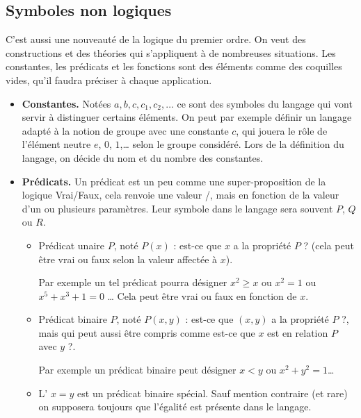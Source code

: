 \documentclass[11pt,class=report,crop=false]{standalone}
\begin{document}
\subsection{Symboles non logiques}

C'est aussi une nouveauté de la logique du premier ordre. On veut des constructions et des théories qui s'appliquent à de nombreuses situations. 
Les constantes, les prédicats et les fonctions sont des éléments comme des coquilles vides, qu'il faudra préciser à chaque application.
 
\begin{itemize}
	\item \textbf{Constantes.}
	Notées $a, b, c, c_1, c_2,\ldots$ ce sont des symboles du langage qui vont servir à distinguer certains éléments.
	On peut par exemple définir un langage adapté à la notion de groupe avec une constante $c$, qui jouera le rôle de l'élément neutre
	$e$, $0$, $1$,\ldots{} selon le groupe considéré.
	Lors de la définition du langage, on décide du nom et du nombre des constantes.
	
	
	\item \textbf{Prédicats.}
	Un prédicat est un peu comme une super-proposition de la logique Vrai/Faux, cela renvoie une valeur \ltrue/\lfalse, mais en fonction de la valeur d'un ou plusieurs paramètres.
	Leur symbole dans le langage sera souvent $P$, $Q$ ou $R$.
	\begin{itemize}
		\item Prédicat unaire $P$, noté $P(x)$ : \og{}est-ce que $x$ a la propriété $P$ ?\fg{} (cela peut être vrai ou faux selon la valeur affectée à $x$).
		
		Par exemple un tel prédicat pourra désigner \og{}$x^2 \ge x$\fg{} ou \og{}$x^2=1$\fg{} ou \og{}$x^5+x^3+1=0$\fg{} \ldots{}
		Cela peut être vrai ou faux en fonction de $x$.
		
		
		\item Prédicat binaire $P$, noté $P(x,y)$ : \og{}est-ce que $(x,y)$ a la propriété $P$ ?\fg{}, mais qui peut aussi être compris comme 
		\og{}est-ce que $x$ est en relation $P$ avec $y$ ?\fg{}.
		
		Par exemple un prédicat binaire peut désigner \og{}$x < y$\fg{} ou \og{}$x^2+y^2 = 1$\fg{}\ldots{}
		
		\item L' \og{}$x = y$\fg{} est un prédicat binaire spécial. Sauf mention contraire (et rare) on supposera toujours que l'égalité est présente dans le langage.
		

\end{itemize}
\end{itemize}
\end{document}
